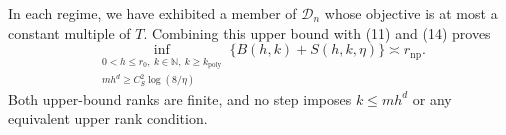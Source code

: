 In each regime, we have exhibited a member of \(\mathcal D_n\) whose objective is at most a constant multiple of \(T\).  Combining this upper bound with (11) and (14) proves
\[
 \inf_{\substack{0<h\le r_0,\ k\in\mathbb N,\ k\ge k_{\mathrm{poly}}\\
                  m h^d\ge C_S^2\log(8/\eta)}}
 \{B(h,k)+S(h,k,\eta)\}
 \asymp r_{\mathrm{np}}.
\]
Both upper-bound ranks are finite, and no step imposes \(k\le m h^d\) or any equivalent upper rank condition.
